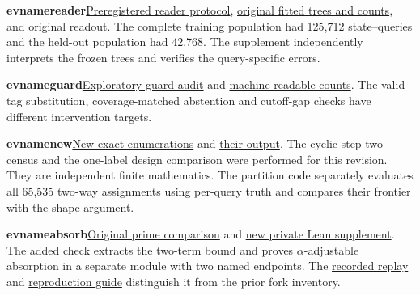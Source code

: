 \documentclass[11pt,letterpaper]{article}
\newcommand{\evitem}[2]{\par\medskip\noindent\hypertarget{ev-#1}{\textsf{\bfseries\color{teal}\csname evname#1\endcsname}}\quad #2\par}
\newcommand{\origlink}[2]{\href{https://github.com/nousentllc/riemann-hypothesis/blob/40e56bab026552e089d7afcfeff08d2defb9c005/src/#1}{#2}}
\begin{document}
\evitem{reader}{\href{run:evidence/changing-cutoff-reader/PROTOCOL.md}{Preregistered reader protocol}, \href{run:evidence/changing-cutoff-reader/results.json}{original fitted trees and counts}, and \href{run:evidence/changing-cutoff-reader/README.md}{original readout}. The complete training population had 125,712 state–queries and the held-out population had 42,768. The supplement independently interprets the frozen trees and verifies the query-specific errors.}
\evitem{guard}{\href{run:evidence/changing-cutoff-reader/GUARD_AUDIT.md}{Exploratory guard audit} and \href{run:evidence/changing-cutoff-reader/audit_guard.json}{machine-readable counts}. The valid-tag substitution, coverage-matched abstention and cutoff-gap checks have different intervention targets.}
\evitem{new}{\href{run:evidence/witness_distinctions.py}{New exact enumerations} and \href{run:evidence/witness_distinctions.json}{their output}. The cyclic step-two census and the one-label design comparison were performed for this revision. They are independent finite mathematics. The partition code separately evaluates all 65,535 two-way assignments using per-query truth and compares their frontier with the shape argument.}
\evitem{absorb}{\origlink{Development/AutomorphicArithmetic/PrimitiveCosets/CoreGm.lean}{Original prime comparison} and \href{run:evidence/CoreBudgetFinal.lean}{new private Lean supplement}. The added check extracts the two-term bound and proves \(\alpha\)-adjustable absorption in a separate module with two named endpoints. The \href{run:evidence/core_budget_verification.json}{recorded replay} and \href{run:evidence/README.md}{reproduction guide} distinguish it from the prior fork inventory.}
\end{document}
